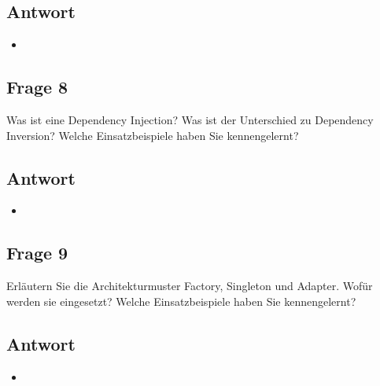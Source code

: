 \subsection*{Antwort}
\begin{itemize}
	\item 
\end{itemize}

\subsection*{Frage 8}
Was ist eine Dependency Injection? Was ist der Unterschied zu Dependency Inversion? Welche Einsatzbeispiele haben Sie kennengelernt?
\subsection*{Antwort}
\begin{itemize}
	\item 
\end{itemize}

\subsection*{Frage 9}
Erläutern Sie die Architekturmuster Factory, Singleton und Adapter. Wofür werden sie eingesetzt? Welche Einsatzbeispiele haben Sie kennengelernt?
\subsection*{Antwort}
\begin{itemize}
	\item 
\end{itemize}
